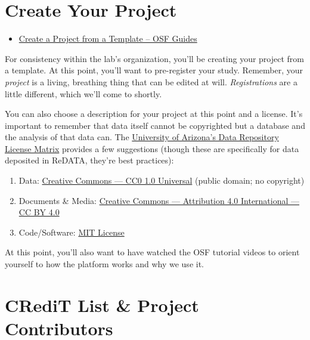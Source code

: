 \documentclass[]{tufte-book}
\providecommand{\tightlist}{%
  \setlength{\itemsep}{0pt}\setlength{\parskip}{0pt}}
\begin{document}
\hypertarget{create-your-project}{%
\section{Create Your Project}\label{create-your-project}}

\begin{itemize}
\tightlist
\item
  \href{https://help.osf.io/hc/en-us/articles/360019930093-Create-a-Project-from-a-Template\#Use-a-public-project-as-a-template}{Create a Project from a Template -- OSF Guides}
\end{itemize}

For consistency within the lab's organization, you'll be creating your project from a template. At this point, you'll want to pre-register your study. Remember, your \emph{project} is a living, breathing thing that can be edited at will. \emph{Registrations} are a little different, which we'll come to shortly.

You can also choose a description for your project at this point and a license. It's important to remember that data itself cannot be copyrighted but a database and the analysis of that data can. The \href{https://osf.io/f57nz/}{University of Arizona's Data Repository License Matrix} provides a few suggestions (though these are specifically for data deposited in ReDATA, they're best practices):

\begin{enumerate}
\def\labelenumi{\arabic{enumi}.}
\tightlist
\item
  Data: \href{https://creativecommons.org/publicdomain/zero/1.0/}{Creative Commons --- CC0 1.0 Universal} (public domain; no copyright)
\item
  Documents \& Media: \href{https://creativecommons.org/licenses/by/4.0/}{Creative Commons --- Attribution 4.0 International --- CC BY 4.0}
\item
  Code/Software: \href{https://choosealicense.com/licenses/mit/}{MIT License}
\end{enumerate}

At this point, you'll also want to have watched the OSF tutorial videos to orient yourself to how the platform works and why we use it.

\hypertarget{credit-list-project-contributors}{%
\section{CRediT List \& Project Contributors}\label{credit-list-project-contributors}}
\end{document}
